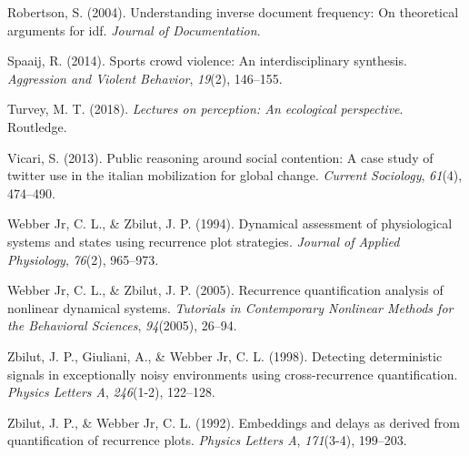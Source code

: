 \documentclass[english,man]{apa6}
\begin{document}
\leavevmode\hypertarget{ref-robertson2004understanding}{}%
Robertson, S. (2004). Understanding inverse document frequency: On theoretical arguments for idf. \emph{Journal of Documentation}.

\leavevmode\hypertarget{ref-spaaij2014sports}{}%
Spaaij, R. (2014). Sports crowd violence: An interdisciplinary synthesis. \emph{Aggression and Violent Behavior}, \emph{19}(2), 146--155.

\leavevmode\hypertarget{ref-turvey2018lectures}{}%
Turvey, M. T. (2018). \emph{Lectures on perception: An ecological perspective}. Routledge.

\leavevmode\hypertarget{ref-vicari2013public}{}%
Vicari, S. (2013). Public reasoning around social contention: A case study of twitter use in the italian mobilization for global change. \emph{Current Sociology}, \emph{61}(4), 474--490.

\leavevmode\hypertarget{ref-webber1994dynamical}{}%
Webber Jr, C. L., \& Zbilut, J. P. (1994). Dynamical assessment of physiological systems and states using recurrence plot strategies. \emph{Journal of Applied Physiology}, \emph{76}(2), 965--973.

\leavevmode\hypertarget{ref-webber2005recurrence}{}%
Webber Jr, C. L., \& Zbilut, J. P. (2005). Recurrence quantification analysis of nonlinear dynamical systems. \emph{Tutorials in Contemporary Nonlinear Methods for the Behavioral Sciences}, \emph{94}(2005), 26--94.

\leavevmode\hypertarget{ref-zbilut1998detecting}{}%
Zbilut, J. P., Giuliani, A., \& Webber Jr, C. L. (1998). Detecting deterministic signals in exceptionally noisy environments using cross-recurrence quantification. \emph{Physics Letters A}, \emph{246}(1-2), 122--128.

\leavevmode\hypertarget{ref-zbilut1992embeddings}{}%
Zbilut, J. P., \& Webber Jr, C. L. (1992). Embeddings and delays as derived from quantification of recurrence plots. \emph{Physics Letters A}, \emph{171}(3-4), 199--203.

\endgroup

\clearpage
\makeatletter
\efloat@restorefloats
\makeatother
\end{document}
